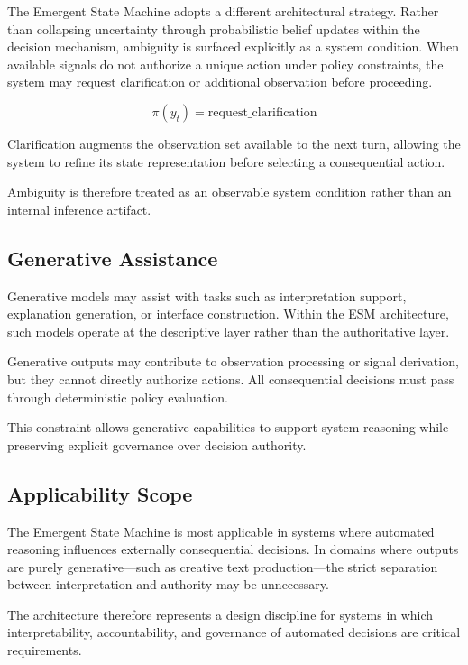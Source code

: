 \documentclass[11pt]{article}
\begin{document}
The Emergent State Machine adopts a different architectural strategy. Rather than collapsing uncertainty through probabilistic belief updates within the decision mechanism, ambiguity is surfaced explicitly as a system condition. When available signals do not authorize a unique action under policy constraints, the system may request clarification or additional observation before proceeding.

\begin{equation}
\pi(y_t) = \text{request\_clarification}
\end{equation}

Clarification augments the observation set available to the next turn, allowing the system to refine its state representation before selecting a consequential action.

Ambiguity is therefore treated as an observable system condition rather than an internal inference artifact.

\subsection{Generative Assistance}

Generative models may assist with tasks such as interpretation support, explanation generation, or interface construction. Within the ESM architecture, such models operate at the descriptive layer rather than the authoritative layer.

Generative outputs may contribute to observation processing or signal derivation, but they cannot directly authorize actions. All consequential decisions must pass through deterministic policy evaluation.

This constraint allows generative capabilities to support system reasoning while preserving explicit governance over decision authority.

\subsection{Applicability Scope}

The Emergent State Machine is most applicable in systems where automated reasoning influences externally consequential decisions. In domains where outputs are purely generative—such as creative text production—the strict separation between interpretation and authority may be unnecessary.

The architecture therefore represents a design discipline for systems in which interpretability, accountability, and governance of automated decisions are critical requirements.
\end{document}
